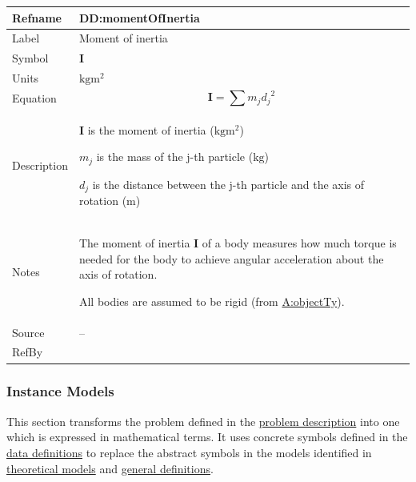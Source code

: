 \documentclass[12pt]{article}
\begin{document}
\medskip
\noindent
\begin{minipage}{\textwidth}
\begin{tabular}{>{\raggedright}p{}>{\raggedright\arraybackslash}p{}}
\toprule \textbf{Refname} & \textbf{DD:momentOfInertia}
\label{DD:momentOfInertia}
\\ \midrule
Label & Moment of inertia
        
\\ \midrule
Symbol & $\symbf{I}$
         
\\ \midrule
Units & $\text{kg}\text{m}^{2}$
        
\\ \midrule
Equation & \begin{displaymath}
           \symbf{I}=\displaystyle\sum{{m_{j}} {d_{j}}^{2}}
           \end{displaymath}
\\ \midrule
Description & \begin{symbDescription}
              \item{$\symbf{I}$ is the moment of inertia ($\text{kg}\text{m}^{2}$)}
              \item{${m_{j}}$ is the mass of the j-th particle (${\text{kg}}$)}
              \item{${d_{j}}$ is the distance between the j-th particle and the axis of rotation (${\text{m}}$)}
              \end{symbDescription}
\\ \midrule
Notes & The moment of inertia $\symbf{I}$ of a body measures how much torque is needed for the body to achieve angular acceleration about the axis of rotation.
        
        All bodies are assumed to be rigid (from \hyperref[assumpOT]{A:objectTy}).
        
\\ \midrule
Source & --
         
\\ \midrule
RefBy & 
\\ \bottomrule
\end{tabular}
\end{minipage}

\subsubsection{Instance Models}
\label{Sec:IMs}
This section transforms the problem defined in the \hyperref[Sec:ProbDesc]{problem description} into one which is expressed in mathematical terms. It uses concrete symbols defined in the \hyperref[Sec:DDs]{data definitions} to replace the abstract symbols in the models identified in \hyperref[Sec:TMs]{theoretical models} and \hyperref[Sec:GDs]{general definitions}.
\end{document}
